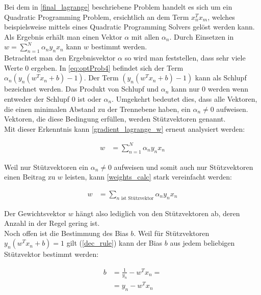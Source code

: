 \documentclass[a4paper,11pt,twoside]{scrreprt}
\begin{document}
Bei dem in \autoref{final_lagrange} beschriebene Problem handelt es sich um ein Quadratic Programming Problem, ersichtlich an dem Term $x_{n}^{T} x_{m}$, welches beispielsweise mittels eines Quadratic Programming Solvers gelöst werden kann. Als Ergebnis erhält man einen Vektor $\alpha$ mit allen $\alpha_{n}$. Durch Einsetzen in $w = \sum_{n=1}^{N} \alpha_{n} y_{n} x_{n}$ kann $w$ bestimmt werden. \\

Betrachtet man den Ergebnisvektor $\alpha$ so wird man feststellen, dass sehr viele Werte $0$ ergeben. In \autoref{eq:optProb4} befindet sich der Term $\alpha_{n} (y_n (w^{T} x_{n} + b)-1)$. Der Term $(y_n (w^{T} x_{n} + b)-1)$ kann als Schlupf bezeichnet werden. Das Produkt von Schlupf und $\alpha_{n}$ kann nur $0$ werden wenn entweder der Schlupf $0$ ist oder $\alpha_{n}$. Umgekehrt bedeutet dies, dass alle Vektoren, die einen minimalen Abstand zu der Trennebene haben, ein $\alpha_{n} \neq 0$ aufweisen. Vektoren, die diese Bedingung erfüllen, werden Stützvektoren genannt. \\


Mit dieser Erkenntnis kann \autoref{gradient_lagrange_w} erneut analysiert werden:

\begin{equation} \label{weights_calc}
	\begin{aligned}
		w &= \sum_{n=1}^{N} \alpha_{n} y_{n} x_{n}
	\end{aligned}
\end{equation}

Weil nur Stützvektoren ein $\alpha_{n} \neq 0$ aufweisen und somit auch nur Stützvektoren einen Beitrag zu $w$ leisten, kann \autoref{weights_calc} stark vereinfacht werden:

\begin{equation} \label{weights_calc2}
	\begin{aligned}
		w &= \sum_{n \text{ ist Stützvektor}} \alpha_{n} y_{n} x_{n}
	\end{aligned}
\end{equation}

Der Gewichtsvektor $w$ hängt also lediglich von den Stützvektoren ab, deren Anzahl in der Regel gering ist.\\


Noch offen ist die Bestimmung des Bias $b$. Weil für Stützvektoren $y_n (w^{T} x_{n} + b) = 1$ gilt (\autoref{dec_rule}) kann der Bias $b$ aus jedem beliebigen Stützvektor bestimmt werden:

\begin{equation} \label{bias_calc}
	\begin{aligned}
		b &= \frac{1}{y_{n}} - w^{T} x_{n} = \\
		&= y_{n} - w^{T} x_{n}
	\end{aligned}
\end{equation}
\end{document}
